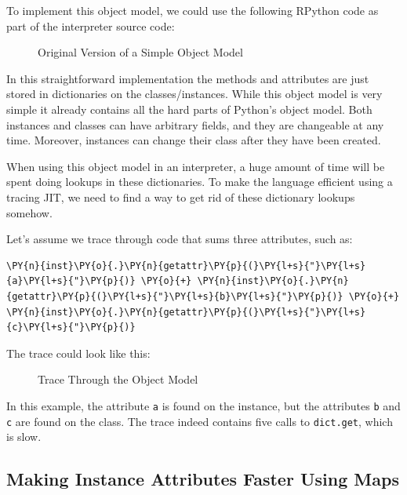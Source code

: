 \documentclass{sig-alternate}
\begin{document}
To implement this object model, we could use the following RPython code as part
of the interpreter source code:

\begin{figure}

\caption{Original Version of a Simple Object Model}
\label{fig:interpreter-slow}
\end{figure}


In this straightforward implementation the methods and attributes are just
stored in dictionaries on the classes/instances. While this object model is very
simple it already contains all the hard parts of Python's object model. Both
instances and classes can have arbitrary fields, and they are changeable at
any time.  Moreover, instances can change their class after they have been
created.

When using this object model in
an interpreter, a huge amount of time will be spent doing lookups in these
dictionaries. To make the language efficient using a tracing JIT, we need to
find a way to get rid of these dictionary lookups somehow.

Let's assume we trace through code that sums three attributes, such as:
\begin{Verbatim}[commandchars=\\\{\}]
\PY{n}{inst}\PY{o}{.}\PY{n}{getattr}\PY{p}{(}\PY{l+s}{"}\PY{l+s}{a}\PY{l+s}{"}\PY{p}{)} \PY{o}{+} \PY{n}{inst}\PY{o}{.}\PY{n}{getattr}\PY{p}{(}\PY{l+s}{"}\PY{l+s}{b}\PY{l+s}{"}\PY{p}{)} \PY{o}{+} \PY{n}{inst}\PY{o}{.}\PY{n}{getattr}\PY{p}{(}\PY{l+s}{"}\PY{l+s}{c}\PY{l+s}{"}\PY{p}{)}
\end{Verbatim}

The trace could look like this:

\begin{figure}

\caption{Trace Through the Object Model}
\label{fig:trace1}
\end{figure}

In this example, the attribute \texttt{a} is found on the instance, but the
attributes \texttt{b} and \texttt{c} are found on the class. The trace indeed contains
five calls to \texttt{dict.get}, which is slow.



\subsection{Making Instance Attributes Faster Using Maps}
\end{document}
